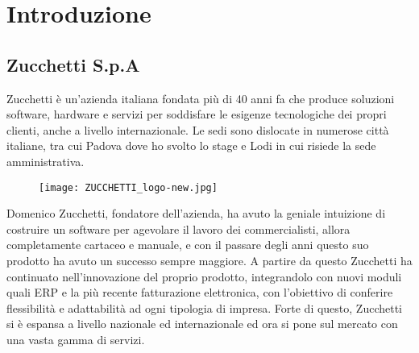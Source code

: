 
\chapter{Introduzione}
\label{cap:introduzione}





\section{Zucchetti S.p.A}
Zucchetti è un'azienda italiana fondata più di 40 anni fa che produce soluzioni software, hardware e servizi per soddisfare le esigenze tecnologiche dei propri clienti, anche a livello internazionale. Le sedi sono dislocate in numerose città italiane, tra cui Padova dove ho svolto lo stage e Lodi in cui risiede la sede amministrativa.


\begin{figure}[htbp]
	\begin{center}
		\texttt{[image: ZUCCHETTI\_logo-new.jpg]}
	\end{center}
\end{figure}

Domenico Zucchetti, fondatore dell'azienda, ha avuto la geniale intuizione di costruire un software per agevolare il lavoro dei commercialisti, allora completamente cartaceo e manuale, e con il passare degli anni questo suo prodotto ha avuto un successo sempre maggiore. A partire da questo Zucchetti ha continuato nell'innovazione del proprio prodotto, integrandolo con nuovi moduli quali ERP e la più recente fatturazione elettronica, con l'obiettivo di conferire flessibilità e adattabilità ad ogni tipologia di impresa. Forte di questo, Zucchetti si è espansa a livello nazionale ed internazionale ed ora si pone sul mercato con una vasta gamma di servizi.


